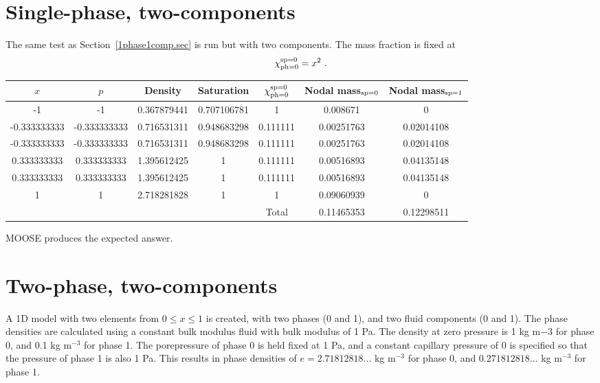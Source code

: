 \newpage

\section{Single-phase, two-components}

The same test as Section~\ref{1phase1comp.sec} is run but with two
components.  The mass fraction is fixed at
\begin{equation}
\massfrac_{\phase=0}^{\species=0} = x^{2} \ .
\end{equation}

\begin{center}
\begin{tabular}{|ccccccc|}
\hline
$x$ & $p$ & Density & Saturation & $\chi_{\mathrm{ph}=0}^{\mathrm{sp}=0}$
& Nodal mass$_{\mathrm{sp}=0}$ & Nodal mass$_{\mathrm{sp}=1}$ \\
\hline
-1 & -1 & 0.367879441 & 0.707106781 & 1 & 0.008671 & 0 \\
-0.333333333 & -0.333333333 & 0.716531311 & 0.948683298 & 0.111111 &
0.00251763 & 0.02014108 \\
-0.333333333 & -0.333333333 & 0.716531311 & 0.948683298 & 0.111111 &
0.00251763 & 0.02014108 \\
0.333333333 & 0.333333333 & 1.395612425 & 1 & 0.111111 & 0.00516893 &
0.04135148 \\
0.333333333 & 0.333333333 & 1.395612425 & 1 & 0.111111 & 0.00516893 &
0.04135148 \\
1& 1 & 2.718281828 & 1 & 1 & 0.09060939 & 0 \\
\hline
 & & & & Total & 0.11465353 & 0.12298511 \\
\hline
\end{tabular}
\end{center}

MOOSE produces the expected answer.

\section{Two-phase, two-components}

A 1D model with two elements from $0 \leq x \leq 1$ is created, with two phases (0 and 1), and two fluid components (0 and 1). The phase densities are calculated using a constant bulk modulus fluid with bulk modulus of 1 Pa. The density at zero pressure is 1 kg m${-3}$ for phase 0, and 0.1 kg m$^{-3}$ for phase 1. The porepressure of phase 0 is held fixed at 1 Pa, and a constant capillary pressure of 0 is specified so that the pressure of phase 1 is also 1 Pa. This results in phase densities of $e = 2.71812818...$ kg m$^{-3}$ for phase 0, and $0.271812818...$ kg m$^{-3}$ for phase 1.

